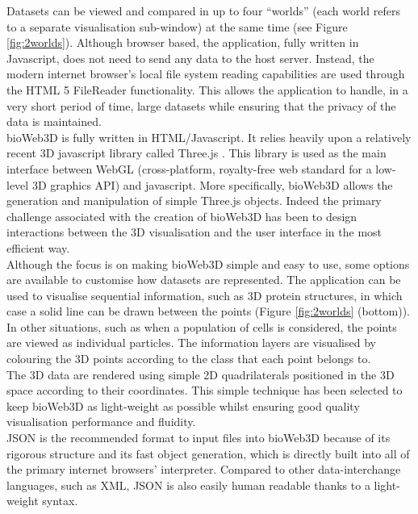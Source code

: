 Datasets can be viewed and compared in up to four ``worlds'' (each world refers to a separate visualisation sub-window) at the same time (see Figure \ref{fig:2worlds}). Although browser based, the application, fully written in Javascript, does not need to send any data to the host server. Instead, the modern internet browser's local file system reading capabilities are used through the HTML 5 FileReader functionality. This allows the application to handle, in a very short period of time, large datasets while ensuring that the privacy of the data is maintained.\\

bioWeb3D is fully written in HTML/Javascript. It relies heavily upon a relatively recent 3D javascript library called Three.js \citep{three}. This library is used as the main interface between WebGL (cross-platform, royalty-free web standard for a low-level 3D graphics API) \citep{webgl} and javascript. More specifically, bioWeb3D allows the generation and manipulation of simple Three.js objects. Indeed the primary challenge associated with the creation of bioWeb3D has been to design interactions between the 3D visualisation and the user interface in the most efficient way.\\


Although the focus is on making bioWeb3D simple and easy to use, some options are available to customise how datasets are represented. The application can be used to visualise sequential information, such as 3D protein structures, in which case a solid line can be drawn between the points (Figure \ref{fig:2worlds} (bottom)). In other situations, such as when a population of cells is considered, the points are viewed as individual particles. The information layers are visualised by colouring the 3D points according to the class that each point belongs to. \\

The 3D data are rendered using simple 2D quadrilaterals positioned in the 3D space according to their coordinates. This simple technique has been selected to keep bioWeb3D as light-weight as possible whilst ensuring good quality visualisation performance and fluidity.\\


JSON is the recommended format to input files into bioWeb3D because of its rigorous structure and its fast object generation, which is directly built into all of the primary internet browsers' interpreter. Compared to other data-interchange languages, such as XML, JSON is also easily human readable thanks to a light-weight syntax.\\

